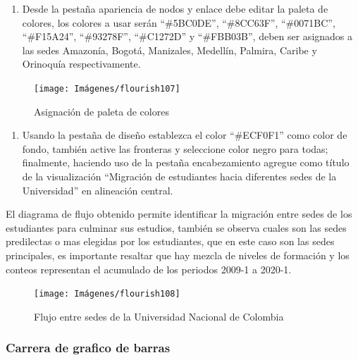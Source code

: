 \documentclass[
]{book}
\providecommand{\tightlist}{%
  \setlength{\itemsep}{0pt}\setlength{\parskip}{0pt}}
\begin{document}
\begin{enumerate}
\def\labelenumi{\arabic{enumi}.}
\setcounter{enumi}{3}
\tightlist
\item
  Desde la pestaña apariencia de nodos y enlace debe editar la paleta de colores, los colores a usar serán ``\#5BC0DE'', ``\#8CC63F'', ``\#0071BC'', ``\#F15A24'', ``\#93278F'', ``\#C1272D'' y ``\#FBB03B'', deben ser asignados a las sedes Amazonía, Bogotá, Manizales, Medellín, Palmira, Caribe y Orinoquía respectivamente.
\end{enumerate}

\begin{figure}

{\centering \texttt{[image: Imágenes/flourish107]} 

}

\caption{Asignación de paleta de colores}\label{fig:paso4sankeyflourish-fig}
\end{figure}

\begin{enumerate}
\def\labelenumi{\arabic{enumi}.}
\setcounter{enumi}{4}
\tightlist
\item
  Usando la pestaña de diseño establezca el color ``\#ECF0F1'' como color de fondo, también active las fronteras y seleccione color negro para todas; finalmente, haciendo uso de la pestaña encabezamiento agregue como título de la visualización ``Migración de estudiantes hacia diferentes sedes de la Universidad'' en alineación central.
\end{enumerate}

El diagrama de flujo obtenido permite identificar la migración entre sedes de los estudiantes para culminar sus estudios, también se observa cuales son las sedes predilectas o mas elegidas por los estudiantes, que en este caso son las sedes principales, es importante resaltar que hay mezcla de niveles de formación y los conteos representan el acumulado de los periodos 2009-1 a 2020-1.

\begin{figure}

{\centering \texttt{[image: Imágenes/flourish108]} 

}

\caption{Flujo entre sedes de la Universidad Nacional de Colombia}\label{fig:finalsankeyflourish-fig}
\end{figure}

\hypertarget{carrerabarrasflourish}{%
\subsubsection{Carrera de grafico de barras}\label{carrerabarrasflourish}}
\end{document}
